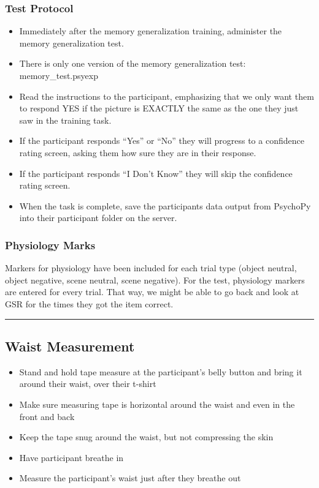 \documentclass[]{book}
\providecommand{\tightlist}{%
  \setlength{\itemsep}{0pt}\setlength{\parskip}{0pt}}
\begin{document}
\hypertarget{test-protocol}{%
\subsubsection{Test Protocol}\label{test-protocol}}

\begin{itemize}
\tightlist
\item
  Immediately after the memory generalization training, administer the memory generalization test.
\item
  There is only one version of the memory generalization test: memory\_test.psyexp
\item
  Read the instructions to the participant, emphasizing that we only want them to respond YES if the picture is EXACTLY the same as the one they just saw in the training task.
\item
  If the participant responds ``Yes'' or ``No'' they will progress to a confidence rating screen, asking them how sure they are in their response.
\item
  If the participant responds ``I Don't Know'' they will skip the confidence rating screen.
\item
  When the task is complete, save the participants data output from PsychoPy into their participant folder on the server.
\end{itemize}

\hypertarget{physiology-marks}{%
\subsubsection{Physiology Marks}\label{physiology-marks}}

Markers for physiology have been included for each trial type (object neutral, object negative, scene neutral, scene negative). For the test, physiology markers are entered for every trial. That way, we might be able to go back and look at GSR for the times they got the item correct.

\begin{center}\rule{0.5\linewidth}{0.5pt}\end{center}

\hypertarget{waist-measurement}{%
\subsection{Waist Measurement}\label{waist-measurement}}

\begin{itemize}
\tightlist
\item
  Stand and hold tape measure at the participant's belly button and bring it around their waist, over their t-shirt
\item
  Make sure measuring tape is horizontal around the waist and even in the front and back
\item
  Keep the tape snug around the waist, but not compressing the skin
\item
  Have participant breathe in
\item
  Measure the participant's waist just after they breathe out
\end{itemize}
\end{document}
